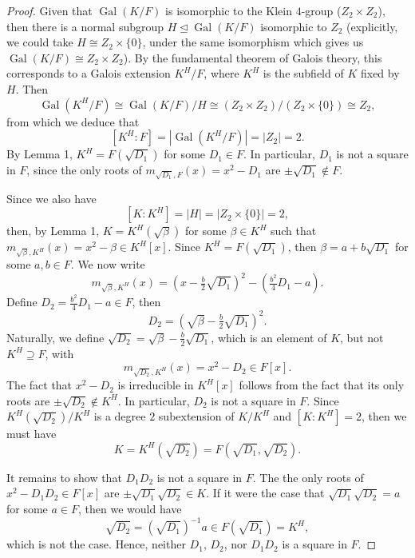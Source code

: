 \documentclass[12pt]{article}
\theoremstyle{definition}
\newcommand{\<}{\langle}
\renewcommand{\>}{\rangle}
\newcommand{\isom}{\cong}
\DeclareMathOperator{\Gal}{Gal}
\newcommand{\teq}{\trianglelefteq}
\begin{document}
\begin{proof}
    Given that $\Gal(K/F)$ is isomorphic to the Klein $4$-group ($Z_2 \times Z_2$), then there is a normal subgroup $H \teq \Gal(K/F)$ isomorphic to $Z_2$ (explicitly, we could take $H \isom Z_2 \times \{0\}$, under the same isomorphism which gives us $\Gal(K/F) \isom Z_2 \times Z_2$). By the fundamental theorem of Galois theory, this corresponds to a Galois extension $K^H/F$, where $K^H$ is the subfield of $K$ fixed by $H$. Then
    \[
        \Gal(K^H/F) \isom \Gal(K/F)/H \isom (Z_2 \times Z_2)/(Z_2\times \{0\}) \isom Z_2,
    \]
    from which we deduce that
    \[
        [K^H : F] = |\Gal(K^H/F)| = |Z_2| = 2.
    \]
    By Lemma 1, $K^H = F(\sqrt{D_1})$ for some $D_1 \in F$. In particular, $D_1$ is not a square in $F$, since the only roots of $m_{\sqrt{D_1}, F}(x) = x^2 - D_1$ are $\pm\sqrt{D_1} \notin F$.

    Since we also have
    \[
        [K : K^H] = |H| = |Z_2 \times \{0\}| = 2,
    \]
    then, by Lemma 1, $K = K^H(\sqrt{\beta})$ for some $\beta \in K^H$ such that $m_{\sqrt{\beta}, K^H}(x) = x^2 - \beta \in K^H[x]$. Since $K^H = F(\sqrt{D_1})$, then $\beta = a + b\sqrt{D_1}$ for some $a, b \in F$. We now write
    \[
        m_{\sqrt{\beta}, K^H}(x) = \left(x - \tfrac{b}{2}\sqrt{D_1}\right)^2 - \left(\tfrac{b^2}{4}D_1 - a\right).
    \]    
    Define $D_2 = \tfrac{b^2}{4}D_1 - a \in F$, then
    \[
        D_2 = \left(\sqrt{\beta} - \tfrac{b}{2}\sqrt{D_1}\right)^2.
    \]
    Naturally, we define $\sqrt{D_2} = \sqrt{\beta} - \tfrac{b}{2}\sqrt{D_1}$, which is an element of $K$, but not $K^H \supseteq F$, with
    \[
        m_{\sqrt{D_2}, K^H}(x) = x^2 - D_2 \in F[x].
    \]
    The fact that $x^2 - D_2$ is irreducible in $K^H[x]$ follows from the fact that its only roots are $\pm\sqrt{D_2} \notin K^H$. In particular, $D_2$ is not a square in $F$. Since $K^H(\sqrt{D_2})/K^H$ is a degree $2$ subextension of $K/K^H$ and $[K : K^H] = 2$, then we must have
    \[
        K = K^H(\sqrt{D_2}) = F(\sqrt{D_1}, \sqrt{D_2}).
    \]

    It remains to show that $D_1D_2$ is not a square in $F$. The the only roots of $x^2 - D_1D_2 \in F[x]$ are $\pm\sqrt{D_1}\sqrt{D_2} \in K$. If it were the case that $\sqrt{D_1}\sqrt{D_2} = a$ for some $a \in F$, then we would have
    \[
        \sqrt{D_2} = (\sqrt{D_1})^{-1}a \in F(\sqrt{D_1}) = K^H,
    \]
    which is not the case. Hence, neither $D_1$, $D_2$, nor $D_1D_2$ is a square in $F$.

\end{proof}
\end{document}
